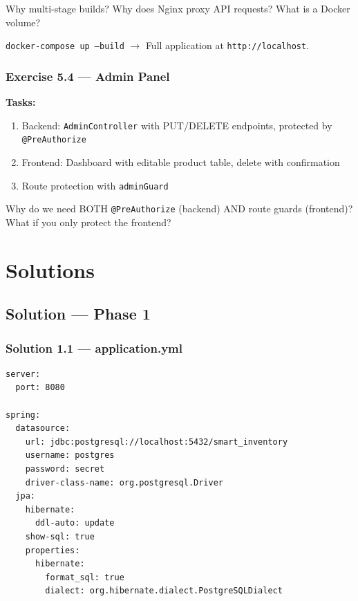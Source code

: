 \documentclass[12pt,a4paper]{report}
\begin{document}
\begin{thinkbox}
Why multi-stage builds? Why does Nginx proxy API requests? What is a Docker volume?
\end{thinkbox}

\begin{checkpoint}
\texttt{docker-compose up --build} $\to$ Full application at \texttt{http://localhost}.
\end{checkpoint}

\section{Exercise 5.4 --- Admin Panel}

\textbf{Tasks:}
\begin{enumerate}
    \item Backend: \texttt{AdminController} with PUT/DELETE endpoints, protected by \texttt{@PreAuthorize}
    \item Frontend: Dashboard with editable product table, delete with confirmation
    \item Route protection with \texttt{adminGuard}
\end{enumerate}

\begin{thinkbox}
Why do we need BOTH \texttt{@PreAuthorize} (backend) AND route guards (frontend)? What if you only protect the frontend?
\end{thinkbox}

\part{Solutions}

\chapter{Solution --- Phase 1}

\section{Solution 1.1 --- application.yml}

\begin{lstlisting}[style=yamlstyle, title={application.yml}]
server:
  port: 8080

spring:
  datasource:
    url: jdbc:postgresql://localhost:5432/smart_inventory
    username: postgres
    password: secret
    driver-class-name: org.postgresql.Driver
  jpa:
    hibernate:
      ddl-auto: update
    show-sql: true
    properties:
      hibernate:
        format_sql: true
        dialect: org.hibernate.dialect.PostgreSQLDialect
\end{lstlisting}
\end{document}

